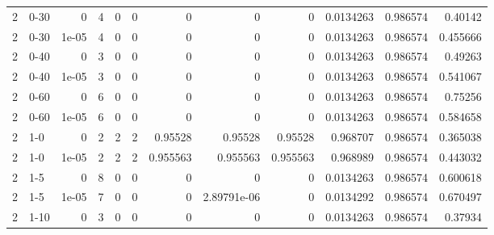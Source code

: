 \begin{tabular}{rlrrrrrrrrrr}
     2 & 0-30   &      0     &           4 &                 0 &                 0 &     0           &     0           &      0           &        0.0134263 &               0.986574 &           0.40142  \\
     2 & 0-30   &      1e-05 &           4 &                 0 &                 0 &     0           &     0           &      0           &        0.0134263 &               0.986574 &           0.455666 \\
     2 & 0-40   &      0     &           3 &                 0 &                 0 &     0           &     0           &      0           &        0.0134263 &               0.986574 &           0.49263  \\
     2 & 0-40   &      1e-05 &           3 &                 0 &                 0 &     0           &     0           &      0           &        0.0134263 &               0.986574 &           0.541067 \\
     2 & 0-60   &      0     &           6 &                 0 &                 0 &     0           &     0           &      0           &        0.0134263 &               0.986574 &           0.75256  \\
     2 & 0-60   &      1e-05 &           6 &                 0 &                 0 &     0           &     0           &      0           &        0.0134263 &               0.986574 &           0.584658 \\
     2 & 1-0    &      0     &           2 &                 2 &                 2 &     0.95528     &     0.95528     &      0.95528     &        0.968707  &               0.986574 &           0.365038 \\
     2 & 1-0    &      1e-05 &           2 &                 2 &                 2 &     0.955563    &     0.955563    &      0.955563    &        0.968989  &               0.986574 &           0.443032 \\
     2 & 1-5    &      0     &           8 &                 0 &                 0 &     0           &     0           &      0           &        0.0134263 &               0.986574 &           0.600618 \\
     2 & 1-5    &      1e-05 &           7 &                 0 &                 0 &     0           &     2.89791e-06 &      0           &        0.0134292 &               0.986574 &           0.670497 \\
     2 & 1-10   &      0     &           3 &                 0 &                 0 &     0           &     0           &      0           &        0.0134263 &               0.986574 &           0.37934  \\

\end{tabular}
